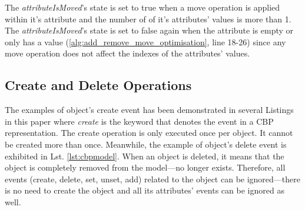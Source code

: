 \documentclass{llncs}
\begin{document}
The \emph{attributeIsMoved}'s state is set to true when a move operation is applied within it's attribute and the number of of it's attributes' values is more than 1. The \emph{attributeIsMoved}'s state is set to false again when the attribute is empty or only has a value (\ref{alg:add_remove_move_optimisation}, line 18-26) since any move operation does not affect the indexes of the attributes' values.



%

\subsection{Create and Delete Operations}
\label{subsec:create_and_delete_operations}
The examples of object's create event has been demonstrated in several Listings in this paper where \emph{create} is the keyword that denotes the event in a CBP representation. The create operation is only executed  once per object. It cannot be created more than once. Meanwhile, the example of object's delete event is exhibited in Lst. \ref{lst:cbpmodel}. When an object is deleted, it means that the object is completely removed from the model---no longer exists. Therefore, all events (create, delete, set, unset, add) related to the object can be ignored---there is no need to create the object and all its attributes' events can be ignored as well. 
\end{document}

